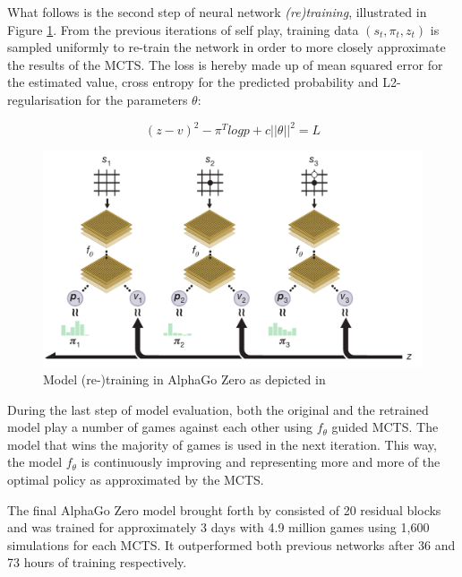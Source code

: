 \documentclass[12pt,a4paper]{article}
\begin{document}
{What follows is the second step of neural network \emph{(re)training}, illustrated in Figure \ref{fig:retraining}. From the previous iterations of self play, training data $(s_t,\pi_t,z_t)$ is sampled uniformly to re-train the network in order to more closely approximate the results of the MCTS. The loss is hereby made up of mean squared error for the estimated value, cross entropy for the predicted probability and L2-regularisation for the parameters $\theta$:

$$(z-v)^2 - \pi^T log p + c ||\theta||^2= L$$

\begin{figure}
  \includegraphics[width=12cm]{img/training.png}
  \centering 
  \caption{Model (re-)training in AlphaGo Zero as depicted in \citet{silver_mastering_2017}}
  \label{fig:retraining}
\end{figure}

During the last step of model evaluation, both the original and the retrained model play a number of games against each other using $f_\theta$ guided MCTS. The model that wins the majority of games is used in the next iteration. This way, the model $f_\theta$ is continuously improving and representing more and more of the optimal policy as approximated by the MCTS.

The final AlphaGo Zero model brought forth by \citet{silver_mastering_2017} consisted of 20 residual blocks and was trained for approximately 3 days with 4.9 million games using 1,600 simulations for each MCTS. It outperformed both previous networks after 36 and 73 hours of training respectively. 

}
\end{document}
